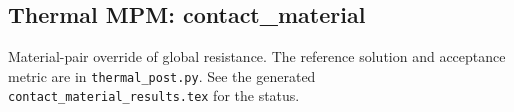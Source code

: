\subsection{Thermal MPM: contact\_material}
Material-pair override of global resistance. The reference solution and acceptance metric are in \texttt{thermal\_post.py}. See the generated \texttt{contact\_material\_results.tex} for the status.
